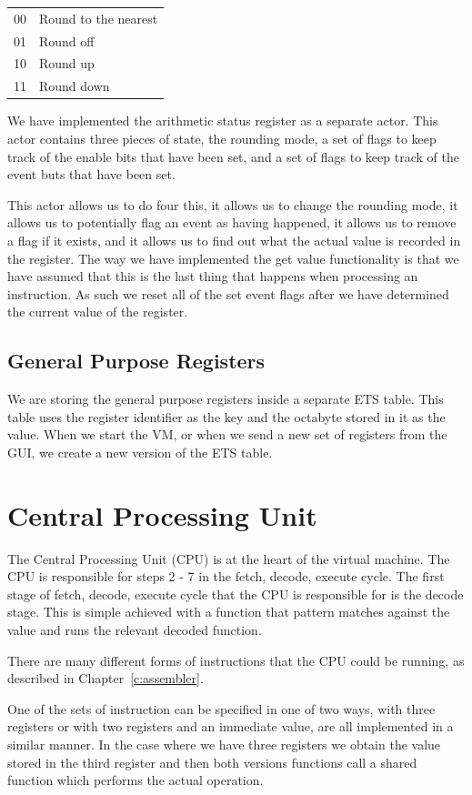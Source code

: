 \documentclass[a4paper,11pt]{report}
\begin{document}
\begin{center}
\begin{tabular}{ c l }
00 & Round to the nearest\\
01 & Round off\\
10 & Round up\\
11 & Round down\\
\end{tabular}
\end{center}

We have implemented the arithmetic status register as a separate actor. This actor contains three pieces of state, the rounding mode, a set of flags to keep track of the enable bits that have been set, and a set of flags to keep track of the event buts that have been set.

This actor allows us to do four this, it allows us to change the rounding mode, it allows us to potentially flag an event as having happened, it allows us to remove a flag if it exists, and it allows us to find out what the actual value is recorded in the register. The way we have implemented the get value functionality is that we have assumed that this is the last thing that happens when processing an instruction. As such we reset all of the set event flags after we have determined the current value of the register. 
\subsection{General Purpose Registers}
We are storing the general purpose registers inside a separate ETS table. This table uses the register identifier as the key and the octabyte stored in it as the value. When we start the VM, or when we send a new set of registers from the GUI, we create a new version of the ETS table.
\section{Central Processing Unit}
The Central Processing Unit (CPU) is at the heart of the virtual machine. The CPU is responsible for steps 2 - 7 in the fetch, decode, execute cycle. The first stage of fetch, decode, execute cycle that the CPU is responsible for is the decode stage. This is simple achieved with a function that pattern matches against the value and runs the relevant decoded function. 

There are many different forms of instructions that the CPU could be running, as described in Chapter~\ref{c:assembler}. 

One of the sets of instruction can be specified in one of two ways, with three registers or with two registers and an immediate value, are all implemented in a similar manner. In the case where we have three registers we obtain the value stored in the third register and then both versions functions call a shared function which performs the actual operation.
\end{document}
